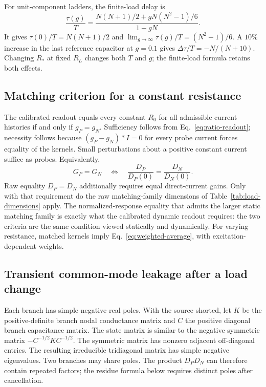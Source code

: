 For unit-component ladders, the finite-load delay is
\begin{equation}\label{eq:unit-delay}
\frac{\tau(g)}T=\frac{N(N+1)/2+gN(N^2-1)/6}{1+gN}.
\end{equation}
It gives $\tau(0)/T=N(N+1)/2$ and $\lim_{g\to\infty}\tau(g)/T=(N^2-1)/6$. A $10\%$ increase in the last reference capacitor at $g=0.1$ gives $\Delta\tau/T=-N/(N+10)$. Changing $R_*$ at fixed $R_L$ changes both $T$ and $g$; the finite-load formula retains both effects.



\subsection{Matching criterion for a constant resistance}
\label{sec:constant-resistance-match}

The calibrated readout equals every constant $R_0$ for all admissible current histories if and only if $g_P=g_N$. Sufficiency follows from Eq.~\eqref{eq:ratio-readout}; necessity follows because $(g_P-g_N)\ast I=0$ for every probe current forces equality of the kernels. Small perturbations about a positive constant current suffice as probes. Equivalently,
\begin{equation}\label{eq:dynamic-normalized-match}
G_P=G_N\quad\Longleftrightarrow\quad
\frac{D_P}{D_P(0)}=\frac{D_N}{D_N(0)}.
\end{equation}
Raw equality $D_P=D_N$ additionally requires equal direct-current gains. Only with that requirement do the raw matching-family dimensions of Table~\ref{tab:load-dimensions} apply. The normalized-response equality that admits the larger static matching family is exactly what the calibrated dynamic readout requires: the two criteria are the same condition viewed statically and dynamically. For varying resistance, matched kernels imply Eq.~\eqref{eq:weighted-average}, with excitation-dependent weights.

\subsection{Transient common-mode leakage after a load change}
\label{sec:cm-pulse}

Each branch has simple negative real poles. With the source shorted, let $K$ be the positive-definite branch nodal conductance matrix and $C$ the positive diagonal branch capacitance matrix. The state matrix is similar to the negative symmetric matrix $-C^{-1/2}KC^{-1/2}$. The symmetric matrix has nonzero adjacent off-diagonal entries. The resulting irreducible tridiagonal matrix has simple negative eigenvalues. Two branches may share poles. The product $D_PD_N$ can therefore contain repeated factors; the residue formula below requires distinct poles after cancellation.

